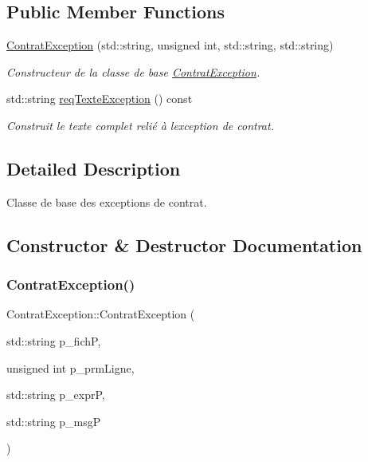 \subsection*{Public Member Functions}
\begin{DoxyCompactItemize}
\item 
\hyperlink{classContratException_ad6c04fb577e960f87e010b125aa636a0}{Contrat\+Exception} (std\+::string, unsigned int, std\+::string, std\+::string)
\begin{DoxyCompactList}\small\item\em Constructeur de la classe de base \hyperlink{classContratException}{Contrat\+Exception}. \end{DoxyCompactList}\item 
std\+::string \hyperlink{classContratException_a59c9ed58985dcdd70af4ee50b2937707}{req\+Texte\+Exception} () const
\begin{DoxyCompactList}\small\item\em Construit le texte complet relié à l\textquotesingle{}exception de contrat. \end{DoxyCompactList}\end{DoxyCompactItemize}


\subsection{Detailed Description}
Classe de base des exceptions de contrat. 

\subsection{Constructor \& Destructor Documentation}
\mbox{\label{classContratException_ad6c04fb577e960f87e010b125aa636a0}} 
\subsubsection{\texorpdfstring{Contrat\+Exception()}{ContratException()}}
{\footnotesize\ttfamily Contrat\+Exception\+::\+Contrat\+Exception (\begin{DoxyParamCaption}\item[{std\+::string}]{p\+\_\+fichP,  }\item[{unsigned int}]{p\+\_\+prm\+Ligne,  }\item[{std\+::string}]{p\+\_\+exprP,  }\item[{std\+::string}]{p\+\_\+msgP }\end{DoxyParamCaption})}



